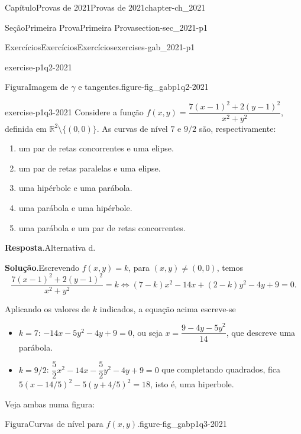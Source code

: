 \documentclass[oneside,10pt,]{book}
\newcommand{\blocktitlefont}{\relax}
\numberwithin{equation}{section}
\newcommand{\R}{\mathbb R}
\begin{document}
\begin{chapterptx}{Capítulo}{Provas de 2021}{}{Provas de 2021}{}{}{chapter-ch_2021}
\begin{sectionptx}{Seção}{Primeira Prova}{}{Primeira Prova}{}{}{section-sec_2021-p1}
\begin{exercises-subsection-numberless}{Exercícios}{Exercícios}{}{Exercícios}{}{}{exercises-gab_2021-p1}
\begin{divisionexercise}{2}{}{}{exercise-p1q2-2021}
\begin{figureptx}{Figura}{Imagem de \(\gamma\) e tangentes.}{figure-fig_gabp1q2-2021}{}
\begin{image}{0.25}{0.5}{0.25}{}
{
}%
\end{image}%
\tcblower
\end{figureptx}%
%
\end{divisionexercise}%
\begin{divisionexercise}{3}{}{}{exercise-p1q3-2021}%
Considere a função \(f(x,y)=\dfrac{7(x-1)^2+2(y-1)^2}{x^2+y^2}\), definida em \(\R^2\setminus\big\{(0,0)\big\}\). As curvas de nível \(7\) e \(9/2\) são, respectivamente:%
\begin{enumerate}[label=\alph*]
\item{}um par de retas concorrentes e uma elipse.%
\item{}um par de retas paralelas e uma elipse.%
\item{}uma hipérbole e uma parábola.%
\item{}uma parábola e uma hipérbole.%
\item{}uma parábola e um par de retas concorrentes.%
\end{enumerate}
%
\par\smallskip%
\noindent\textbf{\blocktitlefont Resposta}.\hypertarget{answer-p1q3-2021-b}{}\quad{}Alternativa d.%
\par\smallskip%
\noindent\textbf{\blocktitlefont Solução}.\hypertarget{solution-p1q3-2021-c}{}\quad{}Escrevendo \(f(x,y)=k\), para \((x,y)\neq (0,0)\), temos%
\begin{equation*}
\dfrac{7(x-1)^2+2(y-1)^2}{x^2+y^2}=k\iff
(7-k)x^2-14x+(2-k)y^2-4y+9=0.
\end{equation*}
%
\par
Aplicando os valores de \(k\) indicados, a equação acima escreve-se%
\begin{itemize}[label=\textbullet]
\item{}\(k=7\): \(-14x-5y^2-4y+9=0\), ou seja \(x=\dfrac{9-4y-5y^2}{14}\), que descreve uma parábola.%
\item{}\(k=9/2\): \(\dfrac{5}{2}x^2-14x-\dfrac{5}{2}y^2-4y+9=0\) que completando quadrados, fica \(5(x-14/5)^2-5(y+4/5)^2=18\), isto é, uma hiperbole.%
\end{itemize}
%
\par
Veja ambas numa figura: \begin{figureptx}{Figura}{Curvas de nível para \(f(x,y)\).}{figure-fig_gabp1q3-2021}{}%

\end{figureptx}
\end{divisionexercise}
\end{exercises-subsection-numberless}
\end{sectionptx}
\end{chapterptx}
\end{document}
